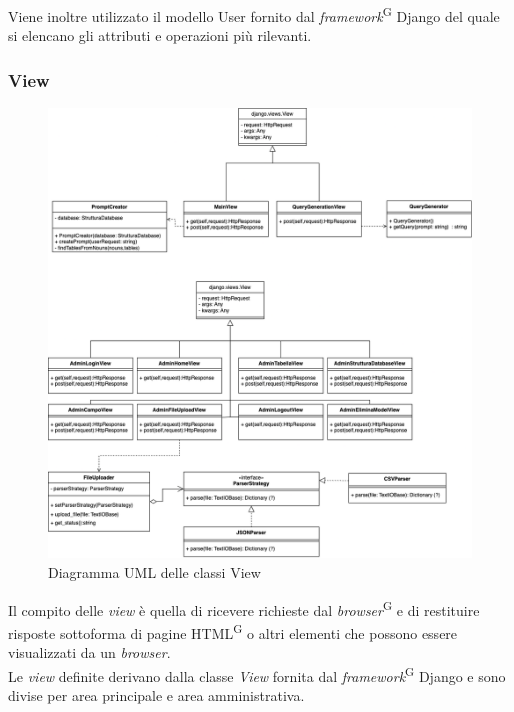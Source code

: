 \documentclass[5pt]{article}
\begin{document}
	Viene inoltre utilizzato il modello User fornito dal \textit{framework}\textsuperscript{G} Django del quale si elencano gli attributi e operazioni più rilevanti.\\
	
	
	\subsubsection{View}
	
	\begin{figure}[H]
		\includegraphics[scale=0.50]{UML_classes/views.png}
		\caption{Diagramma UML delle classi View}
		\centering
	\end{figure}

	
	Il compito delle \textit{view} è quella di ricevere richieste dal \textit{browser}\textsuperscript{G} e di restituire risposte sottoforma di pagine HTML\textsuperscript{G} o altri elementi che possono essere visualizzati da un \textit{browser}.\\
	
	Le \textit{view} definite derivano dalla classe \textit{View} fornita dal \textit{framework}\textsuperscript{G} Django e sono divise per area principale e area amministrativa.\\
	
\end{document}
